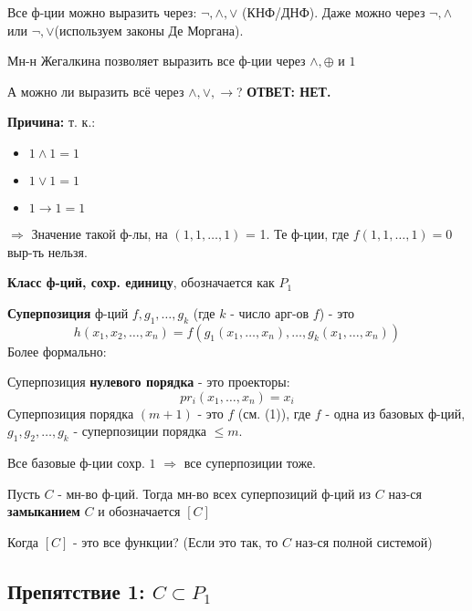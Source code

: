 Все ф-ции можно выразить через: $\neg, \land, \lor$ (КНФ/ДНФ). Даже можно через $\neg, \land$ или $\neg, \lor$(используем законы Де Моргана).

Мн-н Жегалкина позволяет выразить все ф-ции через $\land, \oplus $ и $1$

А можно ли выразить всё через $\land, \lor, \rightarrow$? \textbf{ОТВЕТ: НЕТ.}

\textbf{Причина:} т. к.:
\begin{itemize}
  \item $1 \land 1 = 1$
  \item $1 \lor 1 = 1$
  \item $1 \rightarrow 1 = 1$
\end{itemize}
$\Rightarrow$ Значение такой ф-лы, на $(1, 1, \ldots, 1)$ = 1. Те ф-ции, где $f(1, 1, \ldots, 1) = 0$ выр-ть нельзя.

\begin{symb}
\textbf{Класс ф-ций, сохр. единицу}, обозначается как $P_1$
\end{symb}

\begin{definition}
\textbf{Суперпозиция} ф-ций $f, g_1, \ldots, g_k$ (где $k$ - число арг-ов $f$) - это
\begin{equation}
  h(x_1, x_2, \ldots , x_n) = f(g_1(x_1, \ldots, x_n), \ldots, g_k(x_1, \ldots, x_n))
\end{equation}
Более формально:

Суперпозиция \textbf{нулевого порядка} - это проекторы:
\[
pr_{i}(x_1, \ldots, x_n) = x_i
\] 
Суперпозиция порядка $(m + 1)$ - это $f$ (см. (1)), где $f$ - одна из базовых ф-ций, $g_1, g_2, \ldots , g_k$ - суперпозиции порядка $\leq m$.
\end{definition}
\begin{theorem}
Все базовые ф-ции сохр. $1$ $\Rightarrow$ все суперпозиции тоже.
\end{theorem}

\begin{definition}
Пусть $C$ - мн-во ф-ций. Тогда мн-во всех суперпозиций ф-ций из $C$ наз-ся \textbf{замыканием }$C$ и обозначается $[C]$
\end{definition}

Когда $[C]$ - это все функции? (Если это так, то $C$ наз-ся полной системой)

\subsection{Препятствие 1: $C \subset P_1$}

